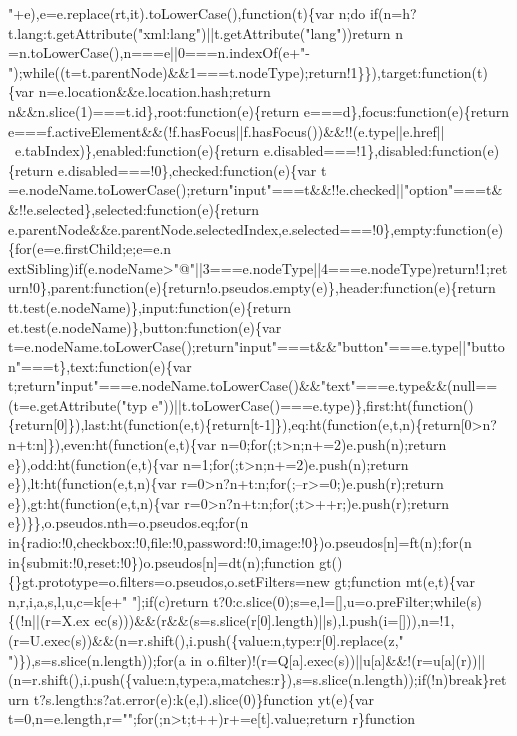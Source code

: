 \begin{DoxyCode}
{       "+e),e=e.replace(rt,it).toLowerCase(),function(t)\{var n;do if(n=h?t.lang:t.getAttribute("xml:lang")||t.getAttribute("lang"))return
       n
      =n.toLowerCase(),n===e||0===n.indexOf(e+"-");while((t=t.parentNode)&&1===t.nodeType);return!1\}\}),target:function(t)\{var n=e.location&&e.location.hash;return n&&n.slice(1)===t.id\},root:function(e)\{return
       e===d\},focus:function(e)\{return
       e===f.activeElement&&(!f.hasFocus||f.hasFocus())&&!!(e.type||e.href||~e.tabIndex)\},enabled:function(e)\{return e.disabled===!1\},disabled:function(e)\{return e.disabled===!0\},checked:function(e)\{var
       t
      =e.nodeName.toLowerCase();return"input"===t&&!!e.checked||"option"===t&&!!e.selected\},selected:function(e)\{return
       e.parentNode&&e.parentNode.selectedIndex,e.selected===!0\},empty:function(e)\{for(e=e.firstChild;e;e=e.n
      extSibling)if(e.nodeName>"@"||3===e.nodeType||4===e.nodeType)return!1;return!0\},parent:function(e)\{return!o.pseudos.empty(e)\},header:function(e)\{return tt.test(e.nodeName)\},input:function(e)\{return
       et.test(e.nodeName)\},button:function(e)\{var
       t=e.nodeName.toLowerCase();return"input"===t&&"button"===e.type||"button"===t\},text:function(e)\{var
       t;return"input"===e.nodeName.toLowerCase()&&"text"===e.type&&(null==(t=e.getAttribute("typ
      e"))||t.toLowerCase()===e.type)\},first:ht(function()\{return[0]\}),last:ht(function(e,t)\{return[t-1]\}),eq:ht(function(e,t,n)\{return[0>n?n+t:n]\}),even:ht(function(e,t)\{var n=0;for(;t>n;n+=2)e.push(n);return
       e\}),odd:ht(function(e,t)\{var n=1;for(;t>n;n+=2)e.push(n);return e\}),lt:ht(function(e,t,n)\{var
       r=0>n?n+t:n;for(;--r>=0;)e.push(r);return e\}),gt:ht(function(e,t,n)\{var r=0>n?n+t:n;for(;t>++r;)e.push(r);return
       e\})\}\},o.pseudos.nth=o.pseudos.eq;for(n in\{radio:!0,checkbox:!0,file:!0,password:!0,image:!0\})o.pseudos[n]=ft(n);for(n
       in\{submit:!0,reset:!0\})o.pseudos[n]=dt(n);function gt()\{\}gt.prototype=o.filters=o.pseudos,o.setFilters=new gt;function
       mt(e,t)\{var n,r,i,a,s,l,u,c=k[e+" "];if(c)return
       t?0:c.slice(0);s=e,l=[],u=o.preFilter;while(s)\{(!n||(r=X.ex
      ec(s)))&&(r&&(s=s.slice(r[0].length)||s),l.push(i=[])),n=!1,(r=U.exec(s))&&(n=r.shift(),i.push(\{value:n,type:r[0].replace(z," ")\}),s=s.slice(n.length));for(a in
       o.filter)!(r=Q[a].exec(s))||u[a]&&!(r=u[a](r))||(n=r.shift(),i.push(\{value:n,type:a,matches:r\}),s=s.slice(n.length));if(!n)break\}return
       t?s.length:s?at.error(e):k(e,l).slice(0)\}function yt(e)\{var t=0,n=e.length,r="";for(;n>t;t++)r+=e[t].value;return r\}function
}
\end{DoxyCode}
